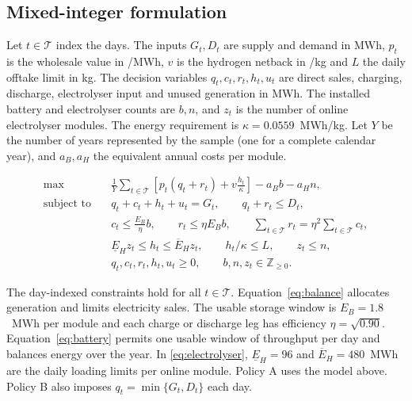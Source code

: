 \subsection{Mixed-integer formulation}\label{sec:formulation}
Let \(t\in\mathcal T\) index the days. The inputs \(G_t,D_t\) are supply and
demand in MWh, \(p_t\) is the wholesale value in \gbp/MWh, \(v\) is the hydrogen
netback in \gbp/kg and \(L\) the daily offtake limit in kg. The decision
variables \(q_t,c_t,r_t,h_t,u_t\) are direct sales, charging, discharge,
electrolyser input and unused generation in MWh. The installed battery and
electrolyser counts are \(b,n\), and \(z_t\) is the number of online
electrolyser modules. The energy requirement is \(\kappa=0.0559\)~MWh/kg.
Let \(Y\) be the number of years represented by the sample (one for a
complete calendar year), and \(a_B,a_H\) the equivalent annual costs per module.

\begin{subequations}\label{eq:tier1-model}
\begin{align}
  \max\quad & \frac{1}{Y}\sum_{t\in\mathcal T}
     \left[p_t(q_t+r_t)+v\frac{h_t}{\kappa}\right]-a_Bb-a_Hn,
       \label{eq:objective}\\
  \text{subject to}\quad
    & q_t+c_t+h_t+u_t=G_t,\qquad q_t+r_t\le D_t,
       \label{eq:balance}\\
    & c_t\le \frac{E_B}{\eta}b,\qquad r_t\le \eta E_Bb,
       \qquad \sum_{t\in\mathcal T}r_t=\eta^2\sum_{t\in\mathcal T}c_t,
       \label{eq:battery}\\
    & \underline{E}_H z_t\le h_t\le \overline{E}_H z_t,
       \qquad h_t/\kappa\le L,\qquad z_t\le n,
       \label{eq:electrolyser}\\
    & q_t,c_t,r_t,h_t,u_t\ge0,\qquad b,n,z_t\in\mathbb Z_{\ge0}.
       \label{eq:domain}
\end{align}
\end{subequations}

The day-indexed constraints hold for all \(t\in\mathcal T\).
Equation~\eqref{eq:balance} allocates generation and limits electricity sales.
The usable storage window is \(E_B=1.8\)~MWh per module and each charge or
discharge leg has efficiency \(\eta=\sqrt{0.90}\).
Equation~\eqref{eq:battery} permits one usable window of throughput per day
and balances energy over the year. In \eqref{eq:electrolyser},
\(\underline{E}_H=96\) and \(\overline{E}_H=480\)~MWh are the daily
loading limits per online module. Policy A uses the model above. Policy B
also imposes \(q_t=\min\{G_t,D_t\}\) each day.

